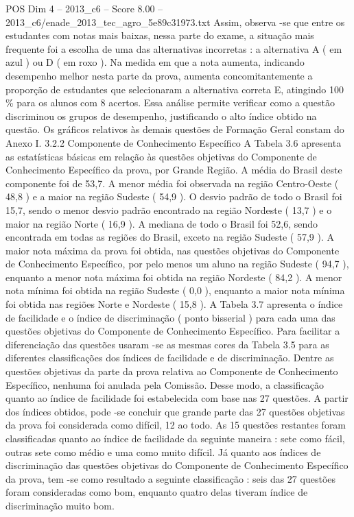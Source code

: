 \begin{textsample}{POS Dim 4 – 2013\_c6 – Score 8.00 – 2013\_c6/enade\_2013\_tec\_agro\_5e89c31973.txt}
Assim, observa -se que entre os estudantes com notas mais baixas, nessa parte do exame, a situação mais frequente foi a escolha de uma das alternativas incorretas : a alternativa A ( em azul ) ou D ( em roxo ).
Na medida em que a nota aumenta, indicando desempenho melhor nesta parte da prova, aumenta concomitantemente a proporção de estudantes que selecionaram a alternativa correta E, atingindo 100 \% para os alunos com 8 acertos.
Essa análise permite verificar como a questão discriminou os grupos de desempenho, justificando o alto índice obtido na questão.
Os gráficos relativos às demais questões de Formação Geral constam do Anexo I. 3.2.2 Componente de Conhecimento Específico A Tabela 3.6 apresenta as estatísticas básicas em relação às questões objetivas do Componente de Conhecimento Específico da prova, por Grande Região.
A média do Brasil deste componente foi de 53,7.
A menor média foi observada na região Centro-Oeste ( 48,8 ) e a maior na região Sudeste ( 54,9 ).
O desvio padrão de todo o Brasil foi 15,7, sendo o menor desvio padrão encontrado na região Nordeste ( 13,7 ) e o maior na região Norte ( 16,9 ).
A mediana de todo o Brasil foi 52,6, sendo encontrada em todas as regiões do Brasil, exceto na região Sudeste ( 57,9 ).
A maior nota máxima da prova foi obtida, nas questões objetivas do Componente de Conhecimento Específico, por pelo menos um aluno na região Sudeste ( 94,7 ), enquanto a menor nota máxima foi obtida na região Nordeste ( 84,2 ).
A menor nota mínima foi obtida na região Sudeste ( 0,0 ), enquanto a maior nota mínima foi obtida nas regiões Norte e Nordeste ( 15,8 ).
A Tabela 3.7 apresenta o índice de facilidade e o índice de discriminação ( ponto bisserial ) para cada uma das questões objetivas do Componente de Conhecimento Específico.
Para facilitar a diferenciação das questões usaram -se as mesmas cores da Tabela 3.5 para as diferentes classificações dos índices de facilidade e de discriminação.
Dentre as questões objetivas da parte da prova relativa ao Componente de Conhecimento Específico, nenhuma foi anulada pela Comissão.
Desse modo, a classificação quanto ao índice de facilidade foi estabelecida com base nas 27 questões.
A partir dos índices obtidos, pode -se concluir que grande parte das 27 questões objetivas da prova foi considerada como difícil, 12 ao todo.
As 15 questões restantes foram classificadas quanto ao índice de facilidade da seguinte maneira : sete como fácil, outras sete como médio e uma como muito difícil.
Já quanto aos índices de discriminação das questões objetivas do Componente de Conhecimento Específico da prova, tem -se como resultado a seguinte classificação : seis das 27 questões foram consideradas como bom, enquanto quatro delas tiveram índice de discriminação muito bom.

\end{textsample}
